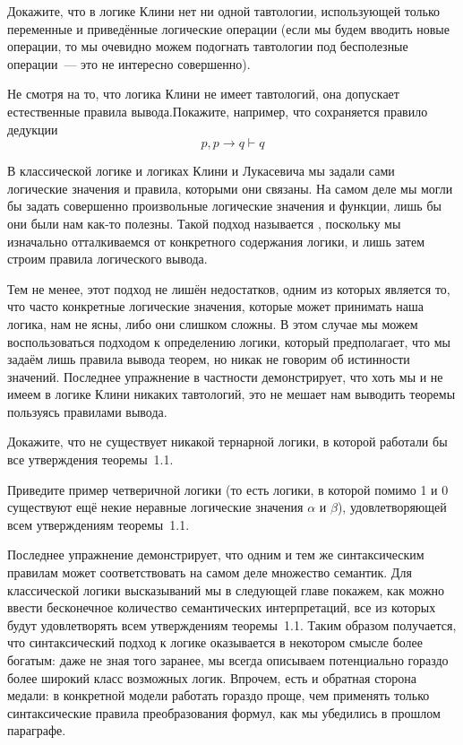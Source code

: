 \begin{exercise}
Докажите, что в логике Клини нет ни одной тавтологии, использующей только переменные и приведённые логические операции (если мы будем вводить новые операции, то мы очевидно можем подогнать тавтологии под бесполезные операции~--- это не интересно совершенно).
\end{exercise}

\begin{exercise}
Не смотря на то, что логика Клини не имеет тавтологий, она допускает естественные правила вывода.Покажите, например, что сохраняется правило дедукции
$$p, p\to q\vdash q$$
\end{exercise}

В классической логике и логиках Клини и Лукасевича мы задали сами логические значения и правила, которыми они связаны. На самом деле мы могли бы задать совершенно произвольные логические значения и функции, лишь бы они были нам как-то полезны. Такой подход называется , поскольку мы изначально отталкиваемся от конкретного содержания логики, и лишь затем строим правила логического вывода.

Тем не менее, этот подход не лишён недостатков, одним из которых является то, что часто конкретные логические значения, которые может принимать наша логика, нам не ясны, либо они слишком сложны. В этом случае мы можем воспользоваться  подходом к определению логики, который предполагает, что мы задаём лишь правила вывода теорем, но никак не говорим об истинности значений. Последнее упражнение в частности демонстрирует, что хоть мы и не имеем в логике Клини никаких тавтологий, это не мешает нам выводить теоремы пользуясь правилами вывода.

\begin{exercise}
Докажите, что не существует никакой тернарной логики, в которой работали бы все утверждения теоремы~1.1.
\end{exercise}

\begin{exercise}
Приведите пример четверичной логики (то есть логики, в которой помимо 1 и 0 существуют ещё некие неравные логические значения $\alpha$ и $\beta$), удовлетворяющей всем утверждениям теоремы~1.1.
\end{exercise}

Последнее упражнение демонстрирует, что одним и тем же синтаксическим правилам может соответствовать на самом деле множество семантик. Для классической логики высказываний мы в следующей главе покажем, как можно ввести бесконечное количество семантических интерпретаций, все из которых будут удовлетворять всем утверждениям теоремы~1.1. Таким образом получается, что синтаксический подход к логике оказывается в некотором смысле более богатым: даже не зная того заранее, мы всегда описываем потенциально гораздо более широкий класс возможных логик. Впрочем, есть и обратная сторона медали: в конкретной модели работать гораздо проще, чем применять только синтаксические правила преобразования формул, как мы убедились в прошлом параграфе.


